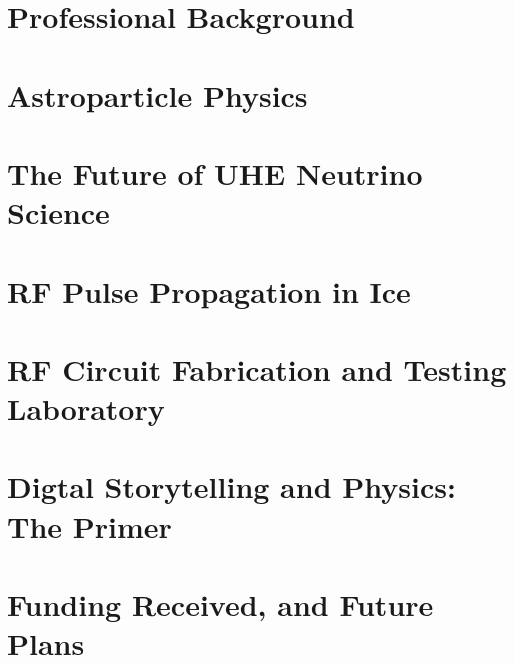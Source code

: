\documentclass[../main.tex]{subfiles}
\begin{document}
\section{Professional Background}

\begin{flushleft}

\end{flushleft}

\section{Astroparticle Physics}

\begin{flushleft}

\end{flushleft}

\section{The Future of UHE Neutrino Science}

\begin{flushleft}

\end{flushleft}

\section{RF Pulse Propagation in Ice}

\begin{flushleft}

\end{flushleft}

\section{RF Circuit Fabrication and Testing Laboratory}

\begin{flushleft}

\end{flushleft}

\section{Digtal Storytelling and Physics: The Primer}

\begin{flushleft}

\end{flushleft}

\section{Funding Received, and Future Plans}

\begin{flushleft}

\end{flushleft}
\end{document}
